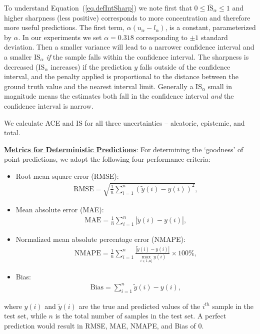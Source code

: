 To understand Equation~(\ref{eq.defIntSharp}) we note first that $0 \leq \overline{\mathrm{IS}}_\alpha \leq1$ and higher sharpness (less positive) corresponds to more concentration and therefore more useful predictions.  The first term, $\alpha( u_{\alpha}-l_{\alpha})$, is a constant, parameterized by $\alpha$. In our experiments we set $\alpha = 0.318$ corresponding to $\pm 1$ standard deviation. Then a smaller variance will lead to a narrower confidence interval and a smaller $\mathrm{IS}_\alpha$ {\it if} the sample falls within the confidence interval.  The sharpness is decreased ($\mathrm{IS}_\alpha$ increases) if the prediction $y$ falls outside of the confidence interval, and the penalty applied is proportional to the distance between the ground truth value and the nearest interval limit. %
Generally a $\mathrm{IS}_\alpha$ small in magnitude means the estimates both fall in the confidence interval {\it and} the confidence interval is narrow.

We calculate ACE and IS for all three uncertainties -- aleatoric, epistemic, and total.












\iffalse
\textbf{\underline{Metrics for Deterministic Predictions}}: For determining the `goodness' of point predictions, we adopt the following four performance criteria:

\begin{itemize}
    \item Root mean square error (RMSE):
    \begin{align}
        \mathrm{RMSE}=\sqrt{\frac{1}{n} \sum_{i=1}^{n}\left(\tilde{y}(i)-y(i)\right)^{2}},
    \end{align}
    \item Mean absolute error (MAE):
    \begin{align}
        \mathrm{MAE}=\frac{1}{n} \sum_{i=1}^{n}\left|\tilde{y}(i)-y(i)\right|,
    \end{align}
    \item Normalized mean absolute percentage error (NMAPE):
    \begin{align}
        \mathrm{NMAPE}=\frac{1}{n} \sum_{i=1}^{n} \frac{\left|\tilde{y}(i)-y(i)\right|}{\max _{i \in 1, \mathrm{n}]} y(i)} \times 100 \%,
    \end{align}
    \item Bias:
    \begin{align}
        \mathrm{Bias} = \sum_{i=1}^{n} \tilde{y}(i)-y(i),
    \end{align}
\end{itemize}
where $y(i)$ and $\tilde{y}(i)$ are the true and predicted values of the $i^{th}$ sample in the test set, while $n$ is the total number of samples in the test set. A perfect prediction would result in RMSE, MAE, NMAPE, and Bias of 0.

